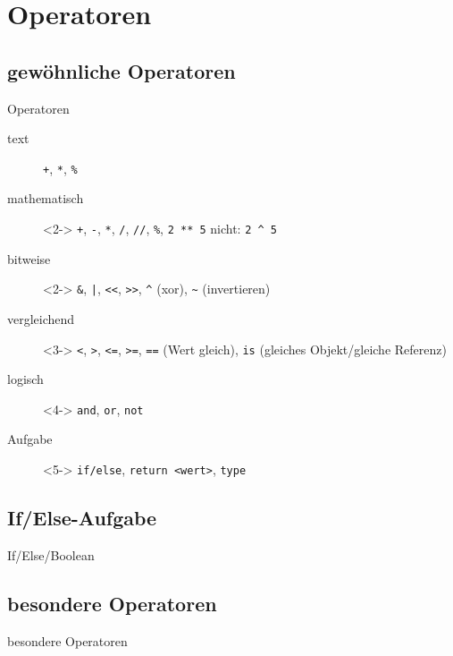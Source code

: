 \section{Operatoren}
\subsection{gewöhnliche Operatoren}
\begin{frame}[fragile]{Operatoren}
	\begin{description}
		\item[text] \alert{\texttt{+}}, \alert{\texttt{*}}, \alert{\texttt{\%}}
		\item[mathematisch]<2-> \alert{\texttt{+}}, \alert{\texttt{-}}, \alert{\texttt{*}}, \alert{\texttt{/}}, \alert{\texttt{//}}, \alert{\texttt{\%}}, \texttt{2 ** 5} nicht: \texttt{2 \^{} 5}
		\item[bitweise]<2-> \alert{\texttt{\&}}, \alert{\texttt{|}}, \alert{\texttt{<<}}, \alert{\texttt{>>}}, \alert{\texttt{\^}} (xor), \alert{\texttt{\~}} (invertieren)
		\item[vergleichend]<3-> \alert{\texttt{<}}, \alert{\texttt{>}}, \alert{\texttt{<=}}, \alert{\texttt{>=}}, \alert{\texttt{==}} (Wert gleich), \alert{\texttt{is}} (gleiches Objekt/gleiche Referenz)
		\item[logisch]<4-> \alert{\texttt{and}}, \alert{\texttt{or}}, \alert{\texttt{not}}
		\item[Aufgabe]<5-> \texttt{if/else}, \texttt{return <wert>}, \texttt{type}
	\end{description}
\end{frame}
\subsection{If/Else-Aufgabe}
\begin{frame}[fragile]{If/Else/Boolean}
	
\end{frame}
\subsection{besondere Operatoren}
\begin{frame}[fragile]{besondere Operatoren}
	\begin{description}
	\end{description}
\end{frame}

